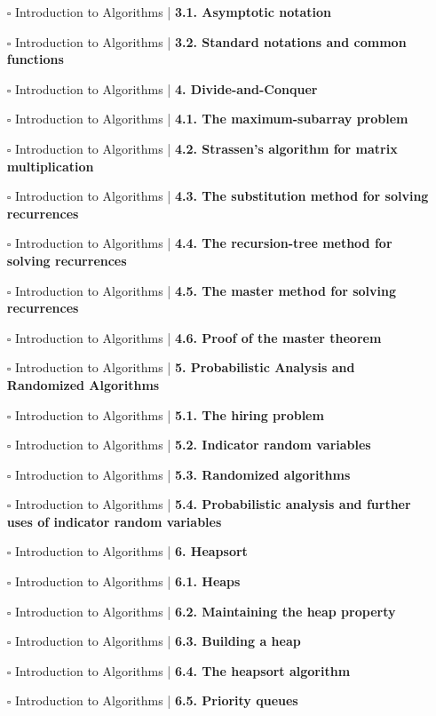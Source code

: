 \documentclass[a4, landscape, 12pt]{article}
\newcommand{\checkbox}{$\square$}%
\begin{document}
\begin{itemize}
{}
\item [\checkbox]  Introduction to Algorithms | \textbf{ 3.1. Asymptotic notation
}
\item [\checkbox]  Introduction to Algorithms | \textbf{ 3.2. Standard notations and common functions
}
\item [\checkbox]  Introduction to Algorithms | \textbf{ 4. Divide-and-Conquer
}
\item [\checkbox]  Introduction to Algorithms | \textbf{ 4.1. The maximum-subarray problem
}
\item [\checkbox]  Introduction to Algorithms | \textbf{ 4.2. Strassen’s algorithm for matrix multiplication
}
\item [\checkbox]  Introduction to Algorithms | \textbf{ 4.3. The substitution method for solving recurrences
}
\item [\checkbox]  Introduction to Algorithms | \textbf{ 4.4. The recursion-tree method for solving recurrences
}
\item [\checkbox]  Introduction to Algorithms | \textbf{ 4.5. The master method for solving recurrences
}
\item [\checkbox]  Introduction to Algorithms | \textbf{ 4.6. Proof of the master theorem
}
\item [\checkbox]  Introduction to Algorithms | \textbf{ 5. Probabilistic Analysis and Randomized Algorithms
}
\item [\checkbox]  Introduction to Algorithms | \textbf{ 5.1. The hiring problem
}
\item [\checkbox]  Introduction to Algorithms | \textbf{ 5.2. Indicator random variables
}
\item [\checkbox]  Introduction to Algorithms | \textbf{ 5.3. Randomized algorithms
}
\item [\checkbox]  Introduction to Algorithms | \textbf{ 5.4. Probabilistic analysis and further uses of indicator random variables
}
\item [\checkbox]  Introduction to Algorithms | \textbf{ 6. Heapsort
}
\item [\checkbox]  Introduction to Algorithms | \textbf{ 6.1. Heaps
}
\item [\checkbox]  Introduction to Algorithms | \textbf{ 6.2. Maintaining the heap property
}
\item [\checkbox]  Introduction to Algorithms | \textbf{ 6.3. Building a heap
}
\item [\checkbox]  Introduction to Algorithms | \textbf{ 6.4. The heapsort algorithm
}
\item [\checkbox]  Introduction to Algorithms | \textbf{ 6.5. Priority queues
}
\end{itemize}
\end{document}
